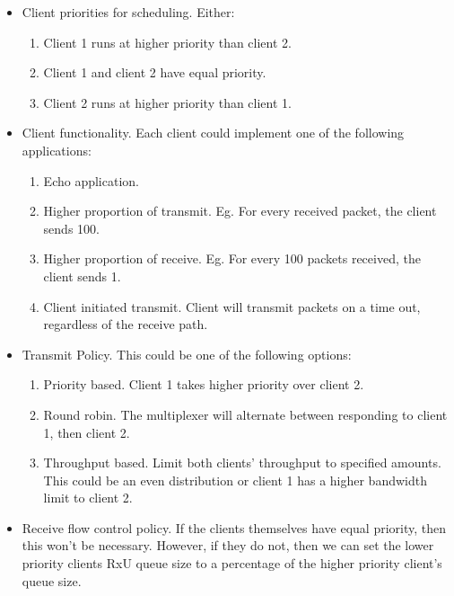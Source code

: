 \begin{itemize}
    \item Client priorities for scheduling. Either:
        \begin{enumerate}
            \item Client 1 runs at higher priority than client 2.
            \item Client 1 and client 2 have equal priority.
            \item Client 2 runs at higher priority than client 1.
        \end{enumerate}
    \item Client functionality. Each client could implement one of the following applications:
        \begin{enumerate}
            \item Echo application.
            \item Higher proportion of transmit. Eg. For every received packet, the client sends 100.
            \item Higher proportion of receive. Eg. For every 100 packets received, the client sends 1.
            \item Client initiated transmit. Client will transmit packets on a time out, regardless of the receive path. 
        \end{enumerate}
    \item Transmit Policy. This could be one of the following options:
        \begin{enumerate}
            \item Priority based. Client 1 takes higher priority over client 2. 
            \item Round robin. The multiplexer will alternate between responding to client 1, then client 2.
            \item Throughput based. Limit both clients' throughput to specified amounts. This could be 
            an even distribution or client 1 has a higher bandwidth limit to client 2.
        \end{enumerate}
    \item Receive flow control policy. If the clients themselves have equal priority, then this won't be necessary. 
    However, if they do not, then we can set the lower priority clients RxU queue size to a percentage of the
    higher priority client's queue size.
\end{itemize}

